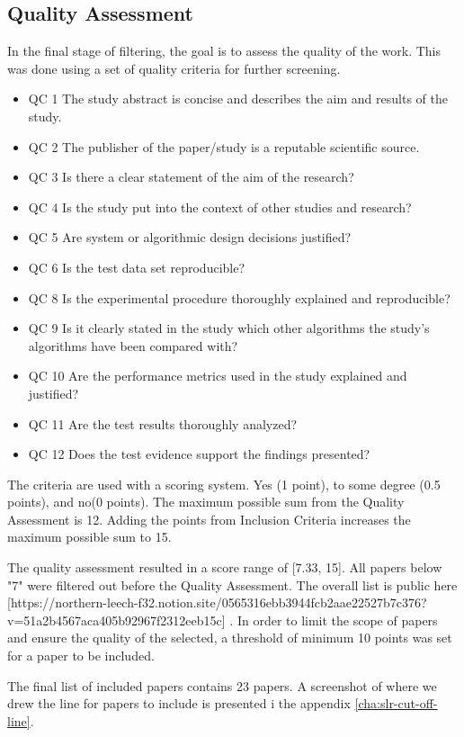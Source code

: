 \subsection{Quality Assessment}
In the final stage of filtering, the goal is to assess the quality of the work.
This was done using a set of quality criteria for further screening.
\begin{itemize}
    \item QC 1	The study abstract is concise and describes the aim and results of the study.
    \item QC 2	The publisher of the paper/study is a reputable scientific source.
    \item QC 3	Is there a clear statement of the aim of the research?
    \item QC 4	Is the study put into the context of other studies and research?
    \item QC 5	Are system or algorithmic design decisions justified?
    \item QC 6	Is the test data set reproducible?
    \item QC 8	Is the experimental procedure thoroughly explained and reproducible?
    \item QC 9	Is it clearly stated in the study which other algorithms the study's algorithms have been compared with?
    \item QC 10	Are the performance metrics used in the study explained and justified?
    \item QC 11	Are the test results thoroughly analyzed?
    \item QC 12 Does the test evidence support the findings presented?
\end{itemize}

The criteria are used with a scoring system.
Yes (1 point), to some degree (0.5 points), and no(0 points).
The maximum possible sum from the Quality Assessment is 12. Adding the points from Inclusion Criteria
increases the maximum possible sum to 15.

The quality assessment resulted in a score range of [7.33, 15].
All papers below "7" were filtered out before
the Quality Assessment.
The overall list is public here [https://northern-leech-f32.notion.site/0565316ebb3944fcb2aae22527b7c376?v=51a2b4567aca405b92967f2312eeb15c]
\cite{SLR-cutoff}.
In order to limit the scope of papers and ensure the quality of the selected, a threshold of minimum 10 points
was set for a paper to be included.

The final list of included papers contains 23 papers. A screenshot of where we drew the line for papers to include
is presented i the appendix \autoref{cha:slr-cut-off-line}.